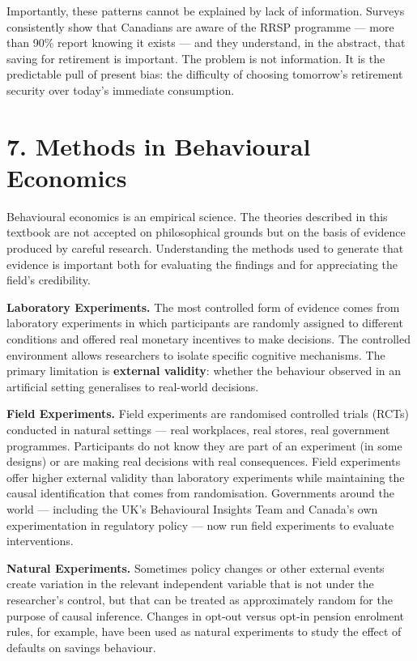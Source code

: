 \documentclass[12pt, letterpaper]{article}
\begin{document}
Importantly, these patterns cannot be explained by lack of information. Surveys consistently show that Canadians are aware of the RRSP programme --- more than 90\% report knowing it exists --- and they understand, in the abstract, that saving for retirement is important. The problem is not information. It is the predictable pull of present bias: the difficulty of choosing tomorrow's retirement security over today's immediate consumption.

\medskip


\section{7. Methods in Behavioural Economics}


Behavioural economics is an empirical science. The theories described in this textbook are not accepted on philosophical grounds but on the basis of evidence produced by careful research. Understanding the methods used to generate that evidence is important both for evaluating the findings and for appreciating the field's credibility.

\textbf{Laboratory Experiments.} The most controlled form of evidence comes from laboratory experiments in which participants are randomly assigned to different conditions and offered real monetary incentives to make decisions. The controlled environment allows researchers to isolate specific cognitive mechanisms. The primary limitation is \textbf{external validity}: whether the behaviour observed in an artificial setting generalises to real-world decisions.

\textbf{Field Experiments.} Field experiments are randomised controlled trials (RCTs) conducted in natural settings --- real workplaces, real stores, real government programmes. Participants do not know they are part of an experiment (in some designs) or are making real decisions with real consequences. Field experiments offer higher external validity than laboratory experiments while maintaining the causal identification that comes from randomisation. Governments around the world --- including the UK's Behavioural Insights Team and Canada's own experimentation in regulatory policy --- now run field experiments to evaluate interventions.

\textbf{Natural Experiments.} Sometimes policy changes or other external events create variation in the relevant independent variable that is not under the researcher's control, but that can be treated as approximately random for the purpose of causal inference. Changes in opt-out versus opt-in pension enrolment rules, for example, have been used as natural experiments to study the effect of defaults on savings behaviour.
\end{document}
